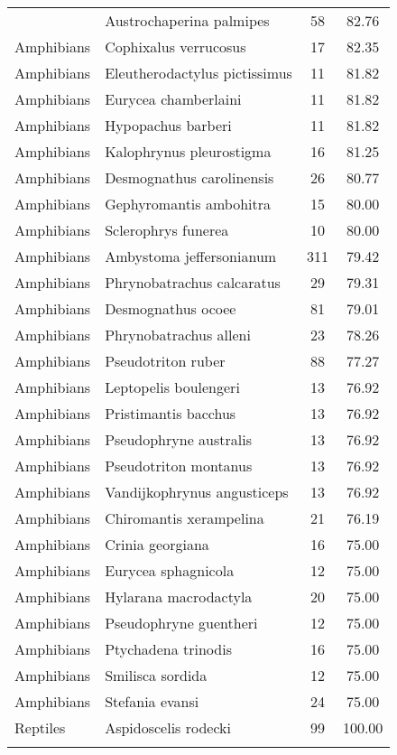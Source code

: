 \begin{longtable}{llcc}
{  Amphibians & Austrochaperina palmipes &  58 & 82.76 \\ 
  Amphibians & Cophixalus verrucosus &  17 & 82.35 \\ 
  Amphibians & Eleutherodactylus pictissimus &  11 & 81.82 \\ 
  Amphibians & Eurycea chamberlaini &  11 & 81.82 \\ 
  Amphibians & Hypopachus barberi &  11 & 81.82 \\ 
  Amphibians & Kalophrynus pleurostigma &  16 & 81.25 \\ 
  Amphibians & Desmognathus carolinensis &  26 & 80.77 \\ 
  Amphibians & Gephyromantis ambohitra &  15 & 80.00 \\ 
  Amphibians & Sclerophrys funerea &  10 & 80.00 \\ 
  Amphibians & Ambystoma jeffersonianum & 311 & 79.42 \\ 
  Amphibians & Phrynobatrachus calcaratus &  29 & 79.31 \\ 
  Amphibians & Desmognathus ocoee &  81 & 79.01 \\ 
  Amphibians & Phrynobatrachus alleni &  23 & 78.26 \\ 
  Amphibians & Pseudotriton ruber &  88 & 77.27 \\ 
  Amphibians & Leptopelis boulengeri &  13 & 76.92 \\ 
  Amphibians & Pristimantis bacchus &  13 & 76.92 \\ 
  Amphibians & Pseudophryne australis &  13 & 76.92 \\ 
  Amphibians & Pseudotriton montanus &  13 & 76.92 \\ 
  Amphibians & Vandijkophrynus angusticeps &  13 & 76.92 \\ 
  Amphibians & Chiromantis xerampelina &  21 & 76.19 \\ 
  Amphibians & Crinia georgiana &  16 & 75.00 \\ 
  Amphibians & Eurycea sphagnicola &  12 & 75.00 \\ 
  Amphibians & Hylarana macrodactyla &  20 & 75.00 \\ 
  Amphibians & Pseudophryne guentheri &  12 & 75.00 \\ 
  Amphibians & Ptychadena trinodis &  16 & 75.00 \\ 
  Amphibians & Smilisca sordida &  12 & 75.00 \\ 
  Amphibians & Stefania evansi &  24 & 75.00 \\ 
  Reptiles & Aspidoscelis rodecki &  99 & 100.00 \\ 
}
\end{longtable}
